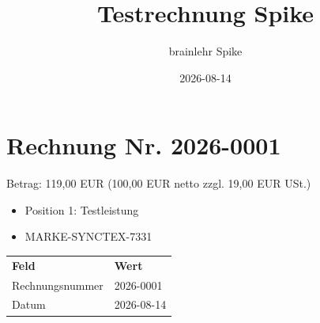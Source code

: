 \documentclass{article}
\title{Testrechnung Spike}
\author{brainlehr Spike}
\date{2026-08-14}
\begin{document}

\section{Rechnung Nr. 2026-0001}

\noindent Betrag: 119,00 EUR (100,00 EUR netto zzgl. 19,00 EUR USt.)

\begin{itemize}
  \item Position 1: Testleistung
  \item MARKE-SYNCTEX-7331\label{bau:testbaustein}
\end{itemize}

\begin{tabular}{ll}
  \textbf{Feld} & \textbf{Wert} \\
  Rechnungsnummer & 2026-0001 \\
  Datum & 2026-08-14 \\
\end{tabular}
\end{document}
